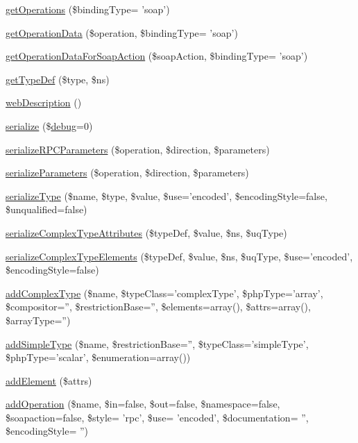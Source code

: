 \begin{DoxyCompactItemize}
\item 
\hyperlink{classwsdl_a1d50941291502c26831b28681dddeb94}{get\-Operations} (\$binding\-Type= 'soap')
\item 
\hyperlink{classwsdl_a38f29f3212405560a4bcf188ad632e1f}{get\-Operation\-Data} (\$operation, \$binding\-Type= 'soap')
\item 
\hyperlink{classwsdl_a5a538dc2c7da9f6f6d6880751318762b}{get\-Operation\-Data\-For\-Soap\-Action} (\$soap\-Action, \$binding\-Type= 'soap')
\item 
\hyperlink{classwsdl_a327b3186f4e3c8b71431ce4a9db77e5a}{get\-Type\-Def} (\$type, \$ns)
\item 
\hyperlink{classwsdl_a43ffc8c82e99905b889fbeb93d4ca6eb}{web\-Description} ()
\item 
\hyperlink{classwsdl_a25fcce1ac19624739857406748ba332a}{serialize} (\$\hyperlink{classnusoap__base_ac652bd9010bd39b0f2854f7ded3f6f33}{debug}=0)
\item 
\hyperlink{classwsdl_aba212dea327156517e32e7a3cd67d88a}{serialize\-R\-P\-C\-Parameters} (\$operation, \$direction, \$parameters)
\item 
\hyperlink{classwsdl_afed507a7c4d2b216e27515ca9181361c}{serialize\-Parameters} (\$operation, \$direction, \$parameters)
\item 
\hyperlink{classwsdl_a06a97e7bc4c0fe43b1193177d3266c30}{serialize\-Type} (\$name, \$type, \$value, \$use='encoded', \$encoding\-Style=false, \$unqualified=false)
\item 
\hyperlink{classwsdl_a1bebf04c625f86d2c65c6a2fc4c69f52}{serialize\-Complex\-Type\-Attributes} (\$type\-Def, \$value, \$ns, \$uq\-Type)
\item 
\hyperlink{classwsdl_a9abd63b860271a2010c4d35b5c607b45}{serialize\-Complex\-Type\-Elements} (\$type\-Def, \$value, \$ns, \$uq\-Type, \$use='encoded', \$encoding\-Style=false)
\item 
\hyperlink{classwsdl_a8086789ccd44f879ab77ba98dfa08aa2}{add\-Complex\-Type} (\$name, \$type\-Class='complex\-Type', \$php\-Type='array', \$compositor='', \$restriction\-Base='', \$elements=array(), \$attrs=array(), \$array\-Type='')
\item 
\hyperlink{classwsdl_a31228a55d8cdb602e32f481406e7455c}{add\-Simple\-Type} (\$name, \$restriction\-Base='', \$type\-Class='simple\-Type', \$php\-Type='scalar', \$enumeration=array())
\item 
\hyperlink{classwsdl_a7341d393047f63fdcb50dd44d2eff448}{add\-Element} (\$attrs)
\item 
\hyperlink{classwsdl_a629076bad717a1ef68261afe210001fc}{add\-Operation} (\$name, \$in=false, \$out=false, \$namespace=false, \$soapaction=false, \$style= 'rpc', \$use= 'encoded', \$documentation= '', \$encoding\-Style= '')

\end{DoxyCompactItemize}
